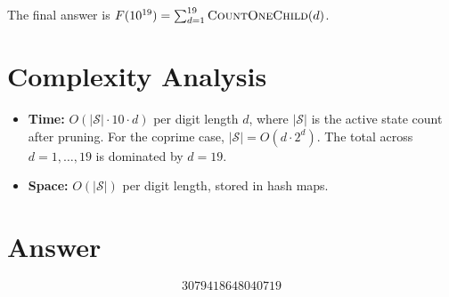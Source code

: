 \documentclass[11pt]{article}
\begin{document}
\noindent The final answer is $F(10^{19}) = \sum_{d=1}^{19} \textsc{CountOneChild}(d)$.

\section{Complexity Analysis}

\begin{itemize}
  \item \textbf{Time:} $O(|\mathcal{S}| \cdot 10 \cdot d)$ per digit length $d$, where $|\mathcal{S}|$ is the active state count after pruning. For the coprime case, $|\mathcal{S}| = O(d \cdot 2^d)$. The total across $d = 1, \ldots, 19$ is dominated by $d = 19$.
  \item \textbf{Space:} $O(|\mathcal{S}|)$ per digit length, stored in hash maps.
\end{itemize}

\section{Answer}

\[
\boxed{3079418648040719}
\]
\end{document}
